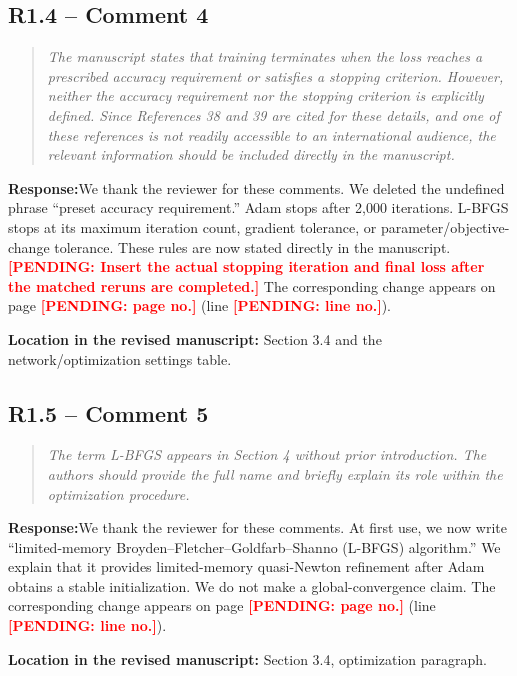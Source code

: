 \documentclass[11pt,a4paper]{article}
\newenvironment{reviewercomment}{\begin{quote}\small\itshape\color{commentgray}}{\end{quote}}
\newcommand{\authorresponse}{\noindent\textbf{Response:}\quad}
\newcommand{\revisionlocation}[1]{\par\noindent\textcolor{locationblue}{\textbf{Location in the revised manuscript: }}#1}
\newcommand{\draftplaceholder}[1]{\textcolor{red}{\textbf{[PENDING: #1]}}}
\begin{document}
\subsection*{R1.4 -- Comment 4}
\begin{reviewercomment}
The manuscript states that training terminates when the loss reaches a prescribed accuracy requirement or satisfies a stopping criterion. However, neither the accuracy requirement nor the stopping criterion is explicitly defined. Since References 38 and 39 are cited for these details, and one of these references is not readily accessible to an international audience, the relevant information should be included directly in the manuscript.
\end{reviewercomment}
\authorresponse We thank the reviewer for these comments. We deleted the undefined phrase “preset accuracy requirement.” Adam stops after 2,000 iterations. L-BFGS stops at its maximum iteration count, gradient tolerance, or parameter/objective-change tolerance. These rules are now stated directly in the manuscript. \draftplaceholder{Insert the actual stopping iteration and final loss after the matched reruns are completed.}
The corresponding change appears on page \draftplaceholder{page no.} (line \draftplaceholder{line no.}).
\revisionlocation{Section 3.4 and the network/optimization settings table.}

\subsection*{R1.5 -- Comment 5}
\begin{reviewercomment}
The term L-BFGS appears in Section 4 without prior introduction. The authors should provide the full name and briefly explain its role within the optimization procedure.
\end{reviewercomment}
\authorresponse We thank the reviewer for these comments. At first use, we now write “limited-memory Broyden--Fletcher--Goldfarb--Shanno (L-BFGS) algorithm.” We explain that it provides limited-memory quasi-Newton refinement after Adam obtains a stable initialization. We do not make a global-convergence claim. The corresponding change appears on page \draftplaceholder{page no.} (line \draftplaceholder{line no.}).
\revisionlocation{Section 3.4, optimization paragraph.}
\end{document}
